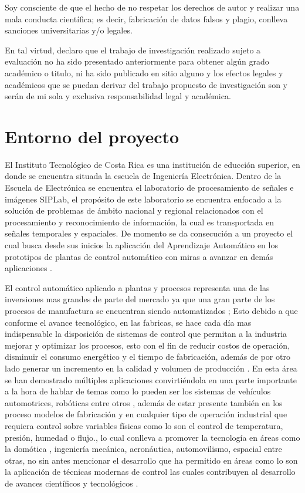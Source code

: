 \documentclass[12pt]{article}
\begin{document}
Soy consciente de que el hecho de no respetar los derechos de autor y realizar una mala conducta científica; es decir, fabricación de datos falsos y plagio, conlleva
sanciones universitarias y/o legales.

En tal virtud, declaro que el trabajo de investigación realizado sujeto a evaluación no ha sido presentado anteriormente para obtener algún grado académico o titulo, ni ha sido publicado en sitio alguno y los efectos legales y académicos que se puedan derivar del trabajo propuesto de investigación son y serán de mi sola y exclusiva responsabilidad legal y académica.

\newpage
\renewcommand{\contentsname}{Contenidos}
\tableofcontents

\newpage

\section{Entorno del proyecto}

El Instituto Tecnológico de Costa Rica es una institución de educción superior, en donde se encuentra situada la escuela de Ingeniería Electrónica. Dentro de la Escuela de Electrónica se encuentra el laboratorio de procesamiento de señales e imágenes SIPLab, el propósito de este laboratorio se encuentra enfocado a la solución de problemas de ámbito nacional y regional relacionados con el procesamiento y reconocimiento de información, la cual es transportada en señales temporales y espaciales. De momento se da consecución a un proyecto el cual busca desde sus inicios la aplicación del Aprendizaje Automático en los prototipos de plantas de control automático con miras a avanzar en demás aplicaciones \cite{1} \cite{13-se}.

El control automático aplicado a plantas y procesos representa una de las inversiones mas grandes de parte del mercado ya que una gran parte de los procesos de manufactura se encuentran siendo automatizados \cite{2}; Esto debido a que conforme el avance tecnológico, en las fabricas, se hace cada día mas indispensable la disposición de sistemas de control que permitan a la industria mejorar y optimizar los procesos, esto con el fin de reducir costos de operación, disminuir el consumo energético y el tiempo de fabricación, además de por otro lado generar un incremento en la calidad y volumen de producción \cite{3} \cite{4}. En esta área se han demostrado múltiples aplicaciones convirtiéndola en una parte importante a la hora de hablar de temas como lo pueden ser los sistemas de vehículos automotrices, robóticas entre otros , además de estar presente también en los proceso modelos de fabricación y en cualquier tipo de operación industrial que requiera control sobre variables físicas como lo son el control de temperatura, presión, humedad o flujo., lo cual conlleva a promover la tecnología en áreas como la domótica , ingeniería mecánica, aeronáutica, automovilismo, espacial entre otras, no sin antes mencionar el desarrollo que ha permitido en áreas como lo son la aplicación de técnicas modernas de control las cuales contribuyen al desarrollo de avances científicos y tecnológicos \cite{4} \cite{3}.
\end{document}
